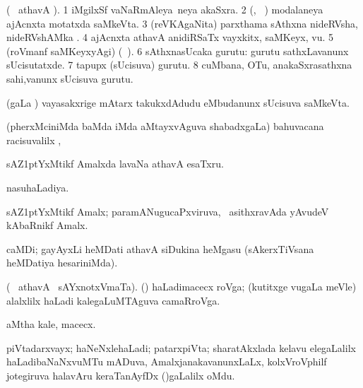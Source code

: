 \bentry 
{}  
\gl{\nA} 
\bmng
(\bava\  athavA ). 
\bnum
\num{1} iMgilxSf vaNaRmAleya \,neya akaSxra. 
\num{2} (\biVga, \sA\ ) modalaneya ajAcnxta motatxda saMkeVta. 
\num{3} (reVKAgaNita) parxthama sAthxna nideRVsha, nideRVshAMka .  
\num{4} ajAcnxta athavA anidiRSaTx vayxkitx, saMKeyx, \mo vu. 
\num{5} (roVmanf saMKeyxyAgi)  (\udA\ ).   
\num{6} sAthxnasUcaka gurutu:   \; gurutu sathxLavanunx sUcisutatxde. 
\num{7} tapupx (sUcisuva) gurutu. 
\num{8} cuMbana, OTu, anakaSxrasathxna sahi,\mo vanunx sUcisuva gurutu.
\enum
\emng
\eentry

\bentry
{} 
\gl{\saMkeV} 
\bmng
(\caci gaLa \vi) vayasakxrige mAtarx takukxdAdudu eMbudanunx  sUcisuva saMkeVta.
\emng
\eentry

\bentry
{} 
\gl{\uparx} 
\bmng
(pherxMciniMda baMda  iMda  aMtayxvAguva shabadxgaLa) bahuvacana racisuvalilx \parx, \udA\  
\emng 
\eentry

\bentry
{} 
\gl{\nA} 
\bmng
sAZ\kern1ptYxMtikf Amalxda lavaNa athavA esaTxru.
\emng
\eentry

\bentry
{} 
\gl{\gu} 
\bmng
nasuhaLadiya.
\emng  
\eentry

\bentry
{} 
\gl{\nA} 
\bmng
sAZ\kern1ptYxMtikf Amalx;  paramANugucaPxviruva, \sA\  asithxravAda yAvudeV kAbaRnikf Amalx.
\emng
\eentry

\bentry
{} 
\gl{\nA}
\bmng
caMDi; gayAyxLi heMDati athavA siDukina heMgasu (sAkerxTiVsana heMDatiya hesariniMda).
\emng
\eentry

\bentry
{}
\gl{\nA} 
\bmng
(\bava\  athavA  \ucAcx\ sAYxnotxVmaTa). ({\roVshA})
\banum
{}  haLadimacecx roVga; (kutitxge \mo vugaLa meVle) alalxlilx haLadi kalegaLuMTAguva camaRroVga.
 
 aMtha kale, macecx.
\eanum
\emng
\eentry

\bentry
{} 
\gl{\nA}
\bmng
piVtadarxvayx; haNeNxlehaLadi; patarxpiVta; sharatAkxlada kelavu elegaLalilx  haLadibaNaNxvuMTu mADuva,  AmalxjanakavanunxLaLx, kolxVroVphilf jotegiruva halavAru keraTanAyfDx ()gaLalilx oMdu.
\emng  
\eentry

